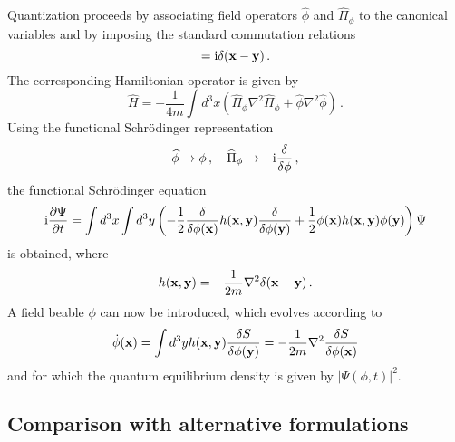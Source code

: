 \documentclass[12pt]{article}
\def\pa{\partial}
\def\ii{\textrm i}
\begin{document}
Quantization proceeds by associating field operators $\widehat{\phi}$ and $\widehat{\Pi}_{\phi}$ to the canonical variables and by imposing the standard commutation relations
\begin{equation}
[\widehat{\phi}({\bf x}), \widehat{\Pi}_{\phi}({\bf y})]=\ii\delta({\bf x}-{\bf y})\,.
\label{s.7.1}
\end{equation}
The corresponding Hamiltonian operator is given by
\begin{equation}
{\widehat H}=-\frac{1}{4m} \int d^3 x \left( \widehat{\Pi}_{\phi} \nabla^2 \widehat{\Pi}_{\phi}  + \widehat{\phi} \nabla^2\widehat{\phi}  \right)\,.
\label{s.8}
\end{equation}
Using the functional Schr{\"o}\-ding\-er representation
\begin{equation}
\widehat{\phi} \to \phi \,, \quad \widehat{\Pi}_{\phi} \to -\ii \frac{\delta }{\delta \phi}\,,
\label{s.12}
\end{equation}
the functional Schr{\"o}\-ding\-er equation
\begin{equation}
\ii\frac{\pa \Psi}{\pa t} = \int d^3 x \int d^3 y  \left(-\frac{1}{2} \frac{\delta }{\delta \phi({\bf x})} h({\bf x},{\bf y})\frac{\delta }{\delta \phi({\bf y})}  + \frac{1}{2} \phi({\bf x})h({\bf x},{\bf y})\phi({\bf y})  \right)\Psi 
\label{s.13}
\end{equation}
is obtained, where 
\begin{equation}
h({\bf x},{\bf y}) = -\frac{1}{2m}\nabla^2 \delta({\bf x}-{\bf y})\,.
\label{s.14}
\end{equation}
A field beable $\phi$ can now be introduced, which evolves according to 
\begin{equation}
{\dot \phi}({\bf x}) = \int d^3 y h({\bf x},{\bf y}) \frac{\delta S}{\delta \phi({\bf y})} =  -\frac{1}{2m}\nabla^2 \frac{\delta S}{\delta \phi({\bf x})} 
\label{s.15}
\end{equation}
and for which the quantum equilibrium density is given by $|\Psi(\phi,t)|^2$.


\subsection{Comparison with alternative formulations}
\end{document}

